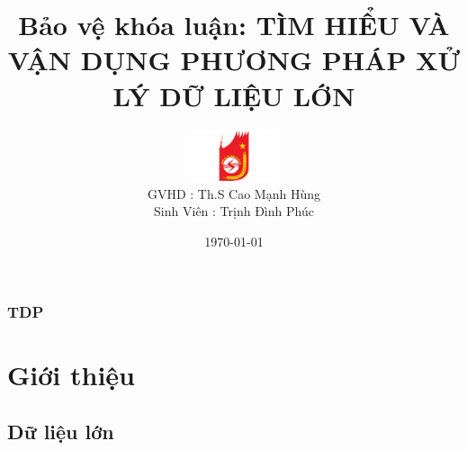 \documentclass[13spt]{beamer}
\begin{document}
\frametitle{TDP}

\title{Bảo vệ khóa luận: \linebreak TÌM HIỂU VÀ VẬN DỤNG PHƯƠNG PHÁP \hspace{5mm}XỬ LÝ DỮ LIỆU LỚN}


\author[ Trịnh Đình Phúc]{\includegraphics[height=1.5cm,width=2.8cm]{logo.png} \\  \hspace{7mm} GVHD \hspace{6mm}: Th.S Cao Mạnh Hùng\\[3mm]{Sinh Viên : Trịnh Đình Phúc\\ \hspace{18mm}}}  

\date{\today} 
\frame{\titlepage} 

\newcommand{\argmax}{\arg\!\max}



\section{Giới thiệu} 
\subsection{Dữ liệu lớn}
\end{document}
